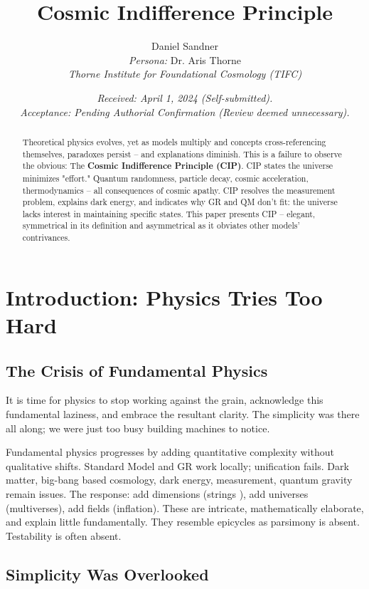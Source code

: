 \documentclass[11pt, a4paper]{article}
\title{\textbf{Cosmic Indifference Principle}}
\author{%
    Daniel Sandner \\ %
    \vspace{0.5em} %
    \textit{Persona:} Dr. Aris Thorne \\
    \textit{Thorne Institute for Foundational Cosmology (TIFC)}%
}
\date{%
    \textit{Received: April 1, 2024 (Self-submitted).}\\
    \textit{Acceptance: Pending Authorial Confirmation (Review deemed unnecessary).}%
}
\begin{document}
\maketitle

\begin{abstract}
Theoretical physics evolves, yet as models multiply and concepts cross-referencing themselves, paradoxes persist -- and explanations diminish. This is a failure to observe the obvious: The \textbf{Cosmic Indifference Principle (CIP)}. CIP states the universe minimizes "effort." Quantum randomness, particle decay, cosmic acceleration, thermodynamics – all consequences of cosmic apathy. CIP resolves the measurement problem, explains dark energy, and indicates why GR and QM don't fit: the universe lacks interest in maintaining specific states. This paper presents CIP -- elegant, symmetrical in its definition and asymmetrical as it obviates other models' contrivances.
\end{abstract}

\clearpage %

\section{Introduction: Physics Tries Too Hard}

\subsection{The Crisis of Fundamental Physics}

It is time for physics to stop working against the grain, acknowledge this fundamental laziness, and embrace the resultant clarity. The simplicity was there all along; we were just too busy building machines \cite{placeholder_ref} to notice.

Fundamental physics progresses by adding quantitative complexity without qualitative shifts. Standard Model \cite{StandardModelRef} and GR \cite{GRRef} work locally; unification fails. Dark matter, big-bang based cosmology, dark energy, measurement, quantum gravity remain issues. The response: add dimensions (strings \cite{StringTheoryCritique}), add universes (multiverses), add fields (inflation). These are intricate, mathematically elaborate, and explain little fundamentally. They resemble epicycles as parsimony is absent. Testability is often absent.

\subsection{Simplicity Was Overlooked}
\end{document}
